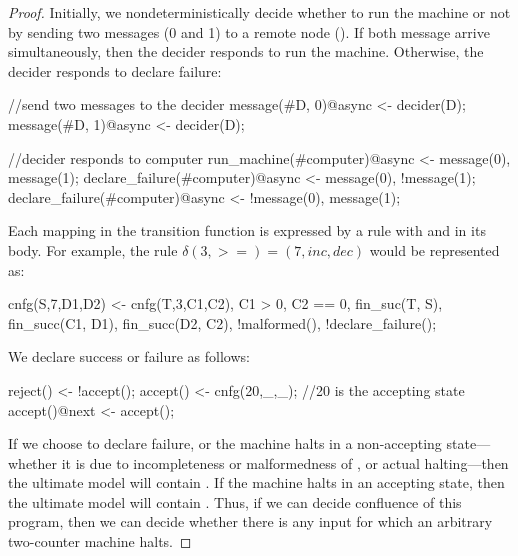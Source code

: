 \begin{proof}
Initially, we nondeterministically decide whether to run the machine or not by sending two messages (0 and 1) to a remote node ().  If both message arrive simultaneously, then the decider responds to run the machine.  Otherwise, the decider responds to declare failure:

\begin{Dedalus}
//send two messages to the decider
message(#D, 0)@async <- decider(D);
message(#D, 1)@async <- decider(D);

//decider responds to computer
run_machine(#computer)@async <- message(0),
                                message(1);
declare_failure(#computer)@async <- message(0),
                                    !message(1);
declare_failure(#computer)@async <- !message(0),
                                    message(1);
\end{Dedalus}

Each mapping in the transition function is expressed by a \lang rule with  and  in its body.  For example, the rule $\delta(3, > =) = (7, inc, dec)$ would be represented as:

\begin{Dedalus}
cnfg(S,7,D1,D2) <- cnfg(T,3,C1,C2), C1 > 0, C2 == 0,
                   fin_suc(T, S), fin_succ(C1, D1),
                   fin_succ(D2, C2), !malformed(),
                   !declare_failure();
\end{Dedalus}

We declare success or failure as follows:

\begin{Dedalus}
reject() <- !accept();
accept() <- cnfg(20,_,_); //20 is the accepting state
accept()@next <- accept();
\end{Dedalus}

If we choose to declare failure, or the machine halts in a non-accepting state---whether it is due to incompleteness or malformedness of , or actual halting---then the ultimate model will contain .  If the machine halts in an accepting state, then the ultimate model will contain .  Thus, if we can decide confluence of this program, then we can decide whether there is any input for which an arbitrary two-counter machine halts.
\end{proof}
